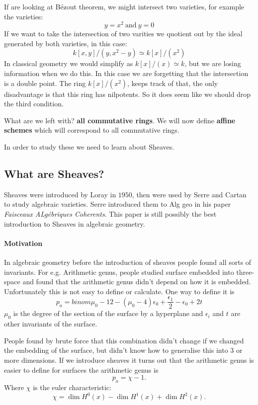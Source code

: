 \begin{example}[]
    If are looking at Bézout theorem, we might intersect two varieties, for example the varieties:
    \begin{equation*}
    y=x^2 \ \text{and} \  y=0
\end{equation*}
If we want to take the intersection of two varities we quotient out by the ideal generated by both varieties, in this case:
\begin{equation*}
    k[x,y]/(y,x^2-y) \simeq k[x]/(x^2)
\end{equation*}
In classical geometry we would simplify as $k[x]/(x) \simeq k$, but we are losing information when we do this. In this case we are forgetting that the intersection is a double point. The ring $k[x]/(x^2)$, keeps track of that, the only disadvantage is that this ring has nilpotents. So it does seem like we should drop the third condition.
\end{example}
What are we left with? \textbf{all commutative rings}. We will now define \textbf{affine schemes} which will correspond to all commutative rings.

In order to study these we need to learn about Sheaves.

    \subsection{What are Sheaves?}
    Sheaves were introduced by Loray in $1950$, then were used by Serre and Cartan to study algebraic varieties. Serre introduced them to Alg geo in his paper \textit{Faisceaux ALgébriques Coherents}. This paper is still possibly the best introduction to Sheaves in algebraic geometry.

\paragraph{Motivation}
In algebraic geometry before the introduction of sheaves people found all sorts of invariants. For e.g. Arithmetic genus, people studied surface embedded into three-space and found that the arithmetic genus didn't depend on how it is embedded. Unfortunately this is not easy to define or calculate. One way to define it is \[
    p_a = binom{\mu_0 -1}{2} - (\mu_0-4)\epsilon_0+\frac{\epsilon_1}{2}-\epsilon_0+2t
\]
$\mu_0 $ is the degree of the section of the surface by a hyperplane and $\epsilon_i$ and  $t$ are other invariants of the surface.

People found by brute force that this combination didn't change if we changed the embedding of the surface, but didn't know how to generalise this into $3$ or more dimensions.
If we introduce sheaves it turns out that the arithmetic genus is easier to define for surfaces the arithmetic genus is \[
    p_a = \chi - 1.\]
Where $\chi$ is the euler characteristic: \[
    \chi = \dim H^0(x) - \dim H^1(x)+ \dim H^2(x).\]

